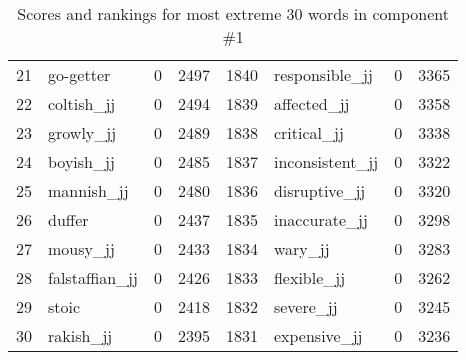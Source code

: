\begin{table}[tbp]
\begin{tabular}{| rlr@{.}l | rlr@{.}l |}
    21 & go-getter & 0 & 2497    &    1840 & responsible\_jj & 0 & 3365 \\
    22 & coltish\_jj & 0 & 2494    &    1839 & affected\_jj & 0 & 3358 \\
    23 & growly\_jj & 0 & 2489    &    1838 & critical\_jj & 0 & 3338 \\
    24 & boyish\_jj & 0 & 2485    &    1837 & inconsistent\_jj & 0 & 3322 \\
    25 & mannish\_jj & 0 & 2480    &    1836 & disruptive\_jj & 0 & 3320 \\
    26 & duffer & 0 & 2437    &    1835 & inaccurate\_jj & 0 & 3298 \\
    27 & mousy\_jj & 0 & 2433    &    1834 & wary\_jj & 0 & 3283 \\
    28 & falstaffian\_jj & 0 & 2426    &    1833 & flexible\_jj & 0 & 3262 \\
    29 & stoic & 0 & 2418    &    1832 & severe\_jj & 0 & 3245 \\
    30 & rakish\_jj & 0 & 2395    &    1831 & expensive\_jj & 0 & 3236 \\
    \hline
    \end{tabular}
    \caption{Scores and rankings for most extreme 30 words in component \#1} 
\end{table}
\clearpage

